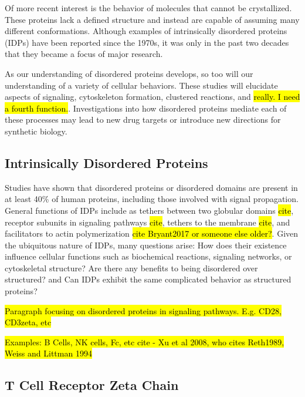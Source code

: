 \documentclass[../AdvancementSummary.tex]{subfiles}
\begin{document}
Of more recent interest is the behavior of molecules that cannot be crystallized. These proteins lack a defined structure and instead are capable of assuming many different conformations. Although examples of intrinsically disordered proteins (IDPs) have been reported since the 1970s, it was only in the past two decades that they became a focus of major research. \cite{Dunker2008} 

As our understanding of disordered proteins develops, so too will our understanding of a variety of cellular behaviors. These studies will elucidate aspects of signaling, cytoskeleton formation, clustered reactions, and \hl{really.  I need a fourth function.}. Investigations into how disordered proteins mediate each of these processes may lead to new drug targets or introduce new directions for synthetic biology.


\subsection{Intrinsically Disordered Proteins}

Studies have shown that disordered proteins or disordered domains are present in at least 40\% of human proteins, including those involved with signal propagation.\cite{Tompa2012} General functions of IDPs include as tethers between two globular domains \hl{cite}, receptor subunits in signaling pathways \hl{cite}, tethers to the membrane \hl{cite}, and facilitators to actin polymerization \hl{cite Bryant2017 or someone else older?}. Given the ubiquitous nature of IDPs, many questions arise: How does their existence influence cellular functions such as biochemical reactions, signaling networks, or cytoskeletal structure?  Are there any benefits to being disordered over structured? and Can IDPs exhibit the same complicated behavior as structured proteins?

\hl{Paragraph focusing on disordered proteins in signaling pathways. E.g. CD28, CD3zeta, etc}

\hl{Examples: B Cells, NK cells, Fc, etc cite - Xu et al 2008, who cites Reth1989, Weiss and Littman 1994}

\subsection{T Cell Receptor Zeta Chain}
\end{document}
